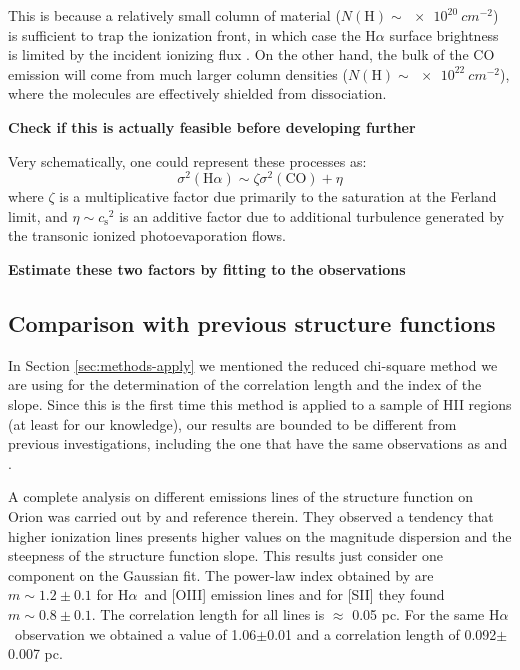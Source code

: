 \documentclass[fleqn,usenatbib, useAMS, a4paper]{mnras}
\newcommand\halpha{H${\alpha}$}
\newcommand\ha{\ensuremath{\text{H}\alpha}}
\newcommand*\chem[1]{\ensuremath{\mathrm{#1}}}
\newcommand\csound{\ensuremath{c_{\text{s}}}}
\begin{document}
This is because a relatively small column of material
(\(N(\chem{H}) \sim \SI{e20}{cm^{-2}}\))
is sufficient to trap the ionization front,
in which case the \ha{} surface brightness is limited by the
incident ionizing flux
\citetext{the Ferland mechanism,
  see section~5.1 of \citealt{Baldwin:1991a}
  and section~B.2.1 of \citealt{Ferland:2012a}
}.
On the other hand, the bulk of the CO emission will come from much larger
column densities (\(N(\chem{H}) \sim \SI{e22}{cm^{-2}}\)),
where the molecules are effectively shielded from dissociation.

\textbf{Check  if this is actually feasible before developing further}

Very schematically, one could represent these processes as:
\begin{equation}
  \label{eq:1}
  \sigma^2(\ha) \sim \zeta \sigma^2(\chem{CO}) + \eta
\end{equation}
where \(\zeta\) is a multiplicative factor
due primarily to the saturation at the Ferland limit,
and \(\eta \sim \csound^2\) is an additive factor due to additional turbulence
generated by the transonic ionized photoevaporation flows.

\textbf{Estimate these two factors by fitting to the observations}

\subsection{Comparison with previous structure functions}

In Section \ref{sec:methods-apply} we mentioned the reduced chi-square method we are using for the determination of the correlation length and the index of the slope. Since this is the first time this method is applied to a sample of HII regions (at least for our knowledge), our results are bounded to be different from previous investigations, including the one that have the same observations as \citet{arthur2016turbulence} and \citet{Melnick:2021x}. 

A complete analysis on different emissions lines of the structure function on Orion was carried out by \citet{arthur2016turbulence} and reference therein. 
They observed a tendency that higher ionization lines presents higher values on the magnitude dispersion and the steepness of the structure function slope. 
This results just consider one component on the Gaussian fit. 
The power-law index obtained by \citet{arthur2016turbulence} are \(m \sim 1.2 \pm 0.1\) for \halpha\ and [OIII] emission lines and for [SII] they found \(m \sim 0.8 \pm 0.1\). 
The correlation length for all lines is \(\approx\) 0.05 pc. For the same \halpha\ observation we obtained a value of 1.06$\pm$0.01 and a correlation length of 0.092$\pm$0.007 pc. 
\end{document}
